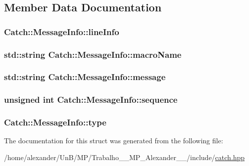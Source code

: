\subsection{Member Data Documentation}
\hypertarget{structCatch_1_1MessageInfo_a985165328723e599696ebd8e43195cc5}{
\subsubsection[{line\-Info}]{ Catch\-::\-Message\-Info\-::line\-Info}}\label{structCatch_1_1MessageInfo_a985165328723e599696ebd8e43195cc5}
\hypertarget{structCatch_1_1MessageInfo_a156ade4b3cc731f6ec7b542ae47ba8e3}{
\subsubsection[{macro\-Name}]{\setlength{\rightskip}{0pt plus 5cm}std\-::string Catch\-::\-Message\-Info\-::macro\-Name}}\label{structCatch_1_1MessageInfo_a156ade4b3cc731f6ec7b542ae47ba8e3}
\hypertarget{structCatch_1_1MessageInfo_ab6cd06e050bf426c6577502a5c50e256}{
\subsubsection[{message}]{\setlength{\rightskip}{0pt plus 5cm}std\-::string Catch\-::\-Message\-Info\-::message}}\label{structCatch_1_1MessageInfo_ab6cd06e050bf426c6577502a5c50e256}
\hypertarget{structCatch_1_1MessageInfo_a7f4f57ea21e50160adefce7b68a781d6}{
\subsubsection[{sequence}]{\setlength{\rightskip}{0pt plus 5cm}unsigned int Catch\-::\-Message\-Info\-::sequence}}\label{structCatch_1_1MessageInfo_a7f4f57ea21e50160adefce7b68a781d6}
\hypertarget{structCatch_1_1MessageInfo_ae928b9117465c696e45951d9d0284e78}{
\subsubsection[{type}]{ Catch\-::\-Message\-Info\-::type}}\label{structCatch_1_1MessageInfo_ae928b9117465c696e45951d9d0284e78}


The documentation for this struct was generated from the following file\-:\begin{DoxyCompactItemize}
\item 
/home/alexander/\-Un\-B/\-M\-P/\-Trabalho\-\_\-\_\-\-M\-P\-\_\-\-Alexander\-\_\-\_/include/\hyperlink{catch_8hpp}{catch.\-hpp}\end{DoxyCompactItemize}
